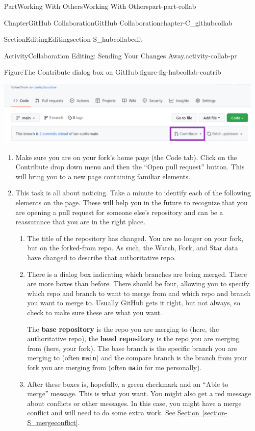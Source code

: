 \documentclass[oneside,10pt,]{book}
\newcommand{\xreffont}{\relax}
\newcommand{\mono}[1]{\texttt{#1}}
\newcommand{\terminology}[1]{\textbf{#1}}
\begin{document}
\begin{partptx}{Part}{Working With Others}{}{Working With Others}{}{}{part-part-collab}
\begin{chapterptx}{Chapter}{GitHub Collaboration}{}{GitHub Collaboration}{}{}{chapter-C_githubcollab}
\begin{sectionptx}{Section}{Editing}{}{Editing}{}{}{section-S_hubcollabedit}
\begin{activity}{Activity}{Collaboration Editing: Sending Your Changes Away.}{activity-collab-pr}
\begin{figureptx}{Figure}{The Contribute dialog box on GitHub.}{figure-fig-hubcollab-contrib}{}%
\begin{image}{0.025}{0.95}{0.025}{}%
\includegraphics[width=\linewidth]{external/hubcollab_contrib.pdf}
\end{image}%
\tcblower
\end{figureptx}%
\begin{enumerate}[font=\bfseries,label=(\alph*),ref=\alph*]%
\item{}Make sure you are on your fork's home page (the Code tab). Click on the Contribute drop down menu and then the ``Open pull request'' button. This will bring you to a new page containing familiar elements.%
\item{}This task is all about noticing. Take a minute to identify each of the following elements on the page. These will help you in the future to recognize that you are opening a pull request for someone else's repository and can be a reassurance that you are in the right place.%
\begin{enumerate}
\item{}The title of the repository has changed. You are no longer on your fork, but on the forked-from repo. As such, the Watch, Fork, and Star data have changed to describe that authoritative repo.%
\item{}There is a dialog box indicating which branches are being merged. There are more boxes than before. There should be four, allowing you to specify which repo and branch to want to merge from and which repo and branch you want to merge to. Usually GitHub gets it right, but not always, so check to make sure these are what you want.%
\par
The \terminology{base repository} is the repo you are merging to (here, the authoritative repo), the \terminology{head repository} is the repo you are merging from (here, your fork). The base branch is the specific branch you are merging to (often \mono{main}) and the compare branch is the branch from your fork you are merging from (often \mono{main} for me personally).%
\item{}After these boxes is, hopefully, a green checkmark and an ``Able to merge'' message. This is what you want. You might also get a red message about conflicts or other messages. In this case, you might have a merge conflict and will need to do some extra work. See \hyperref[section-S_mergeconflict]{Section~{\xreffont\ref{section-S_mergeconflict}}}.%

\end{enumerate}
\end{enumerate}
\end{activity}
\end{sectionptx}
\end{chapterptx}
\end{partptx}
\end{document}
